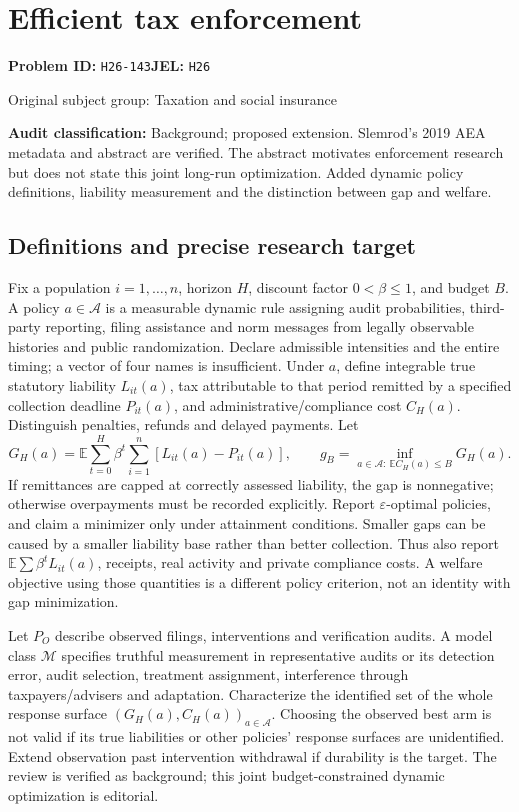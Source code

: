 \documentclass[11pt,a4paper]{article}
\begin{document}
\section*{Efficient tax enforcement}
\textbf{Problem ID:} \texttt{H26-143}\quad \textbf{JEL:} \texttt{H26}\par
\label{problem:OP-0477}
\label{audited:ECON-088}
{\sffamily\small\color{muted}Original subject group: Taxation and social insurance\par}
\label{definitions:problem:30007759}
\textbf{Audit classification:} Background; proposed extension. Slemrod’s 2019 AEA metadata and abstract are verified. The abstract motivates enforcement research but does not state this joint long-run optimization. Added dynamic policy definitions, liability measurement and the distinction between gap and welfare.
\subsection*{Definitions and precise research target}
Fix a population \(i=1,\ldots,n\), horizon \(H\), discount factor \(0<\beta\leq1\), and budget \(B\). A policy \(a\in\mathcal A\) is a measurable dynamic rule assigning audit probabilities, third-party reporting, filing assistance and norm messages from legally observable histories and public randomization. Declare admissible intensities and the entire timing; a vector of four names is insufficient. Under \(a\), define integrable true statutory liability \(L_{it}(a)\), tax attributable to that period remitted by a specified collection deadline \(P_{it}(a)\), and administrative/compliance cost \(C_H(a)\). Distinguish penalties, refunds and delayed payments. Let
\[
 G_H(a)=\mathbb E\sum_{t=0}^H\beta^t\sum_{i=1}^n[L_{it}(a)-P_{it}(a)],
 \qquad g_B=\inf_{a\in\mathcal A:\ \mathbb E C_H(a)\leq B}G_H(a).
\]
If remittances are capped at correctly assessed liability, the gap is nonnegative; otherwise overpayments must be recorded explicitly. Report \(\varepsilon\)-optimal policies, and claim a minimizer only under attainment conditions. Smaller gaps can be caused by a smaller liability base rather than better collection. Thus also report \(\mathbb E\sum\beta^tL_{it}(a)\), receipts, real activity and private compliance costs. A welfare objective using those quantities is a different policy criterion, not an identity with gap minimization.

Let \(P_O\) describe observed filings, interventions and verification audits. A model class \(\mathcal M\) specifies truthful measurement in representative audits or its detection error, audit selection, treatment assignment, interference through taxpayers/advisers and adaptation. Characterize the identified set of the whole response surface \((G_H(a),C_H(a))_{a\in\mathcal A}\). Choosing the observed best arm is not valid if its true liabilities or other policies' response surfaces are unidentified. Extend observation past intervention withdrawal if durability is the target. The review is verified as background; this joint budget-constrained dynamic optimization is editorial.
\end{document}
